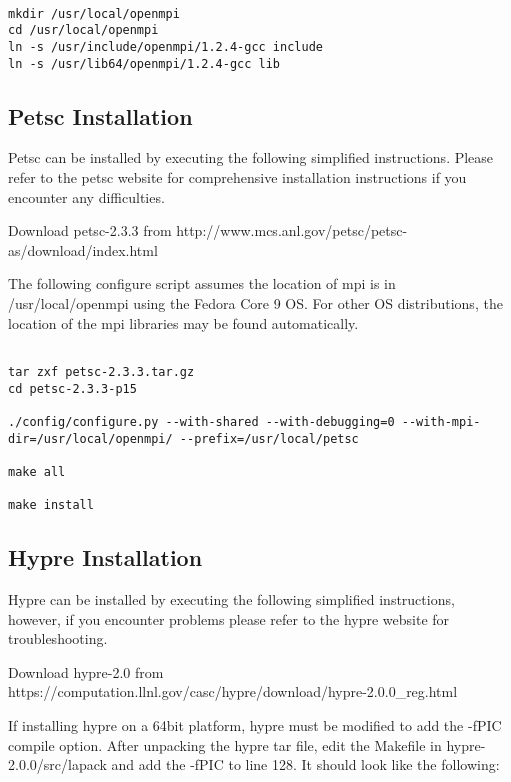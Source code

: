 \begin{Verbatim}

mkdir /usr/local/openmpi
cd /usr/local/openmpi
ln -s /usr/include/openmpi/1.2.4-gcc include
ln -s /usr/lib64/openmpi/1.2.4-gcc lib

\end{Verbatim}



\subsection{Petsc Installation}

Petsc can be installed by executing the following simplified
instructions.  Please refer to the petsc website for comprehensive
installation instructions if you encounter any difficulties.

Download petsc-2.3.3 from
http://www.mcs.anl.gov/petsc/petsc-as/download/index.html

The following configure script assumes the location of mpi is in
/usr/local/openmpi using the Fedora Core 9 OS.  For other OS
distributions, the location of the mpi libraries may be found
automatically.

\begin{Verbatim}
  
tar zxf petsc-2.3.3.tar.gz
cd petsc-2.3.3-p15

./config/configure.py --with-shared --with-debugging=0 --with-mpi-dir=/usr/local/openmpi/ --prefix=/usr/local/petsc

make all

make install

\end{Verbatim}

\subsection{Hypre Installation}

Hypre can be installed by executing the following simplified
instructions, however, if you encounter problems please refer to the
hypre website for troubleshooting.

Download hypre-2.0 from
https://computation.llnl.gov/casc/hypre/download/hypre-2.0.0\_reg.html

If installing hypre on a 64bit platform, hypre must be modified to add
the -fPIC compile option.  After unpacking the hypre tar file, edit
the Makefile in hypre-2.0.0/src/lapack and add the -fPIC to line 128.
It should look like the following:

